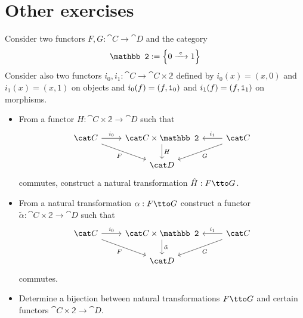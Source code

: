 
\section{Other exercises}

\begin{exercise}
\YetToBeTeXed
\end{exercise}

\begin{exercise}
\YetToBeTeXed
\end{exercise}

\begin{exercise}
\YetToBeTeXed
\end{exercise}

\begin{exercise}
  Consider two functors \(F, G : \cat C \to \cat D\) and the category
  \[
    \mathbb 2 := \set{0 \functo e 1}
  \]
  Consider also two functors \(i_0, i_1 : \cat C \to \cat C \times \mathbb{2}\) defined by \(i_0(x) = (x, 0)\) and \(i_1(x) = (x, 1)\) on
  objects and \(i_0(f) = (f, \mathtt 1_0)\) and \(i_1(f) = (f, \mathtt 1_1)\) on morphisms. 
  \begin{itemize}
  \item From a functor \(H : \cat C \times \mathbb 2 \to \cat D\) such that
   \[
      \begin{tikzcd}
        \cat C \ar["{i_0}", r] \ar["F", dr, swap] & \cat
        C \times \mathbb 2 \ar["H", d] & \cat C \ar["{i_1}", l, swap]
        \ar["G", dl] \\
        & \cat D
      \end{tikzcd}
    \]
    commutes, construct a natural transformation \(\hat H : F \tto G\).

  \item From a natural transformation \(\alpha : F \tto G\) construct a
    functor \(\tilde \alpha : \cat C \times \mathbb 2 \to \cat D\) such that
    \[
      \begin{tikzcd}
        \cat C \ar["{i_0}", r] \ar["F", dr, swap] & \cat
        C \times \mathbb 2 \ar["{\tilde \alpha}", d] & \cat C \ar["{i_1}", l, swap]
        \ar["G", dl] \\
        & \cat D
      \end{tikzcd}
    \]
    commutes.

  \item Determine a bijection between natural transformations \(F \tto
    G\) and certain functors \(\cat C \times \mathbb 2 \to \cat D\). 
  \end{itemize} 
\end{exercise}


